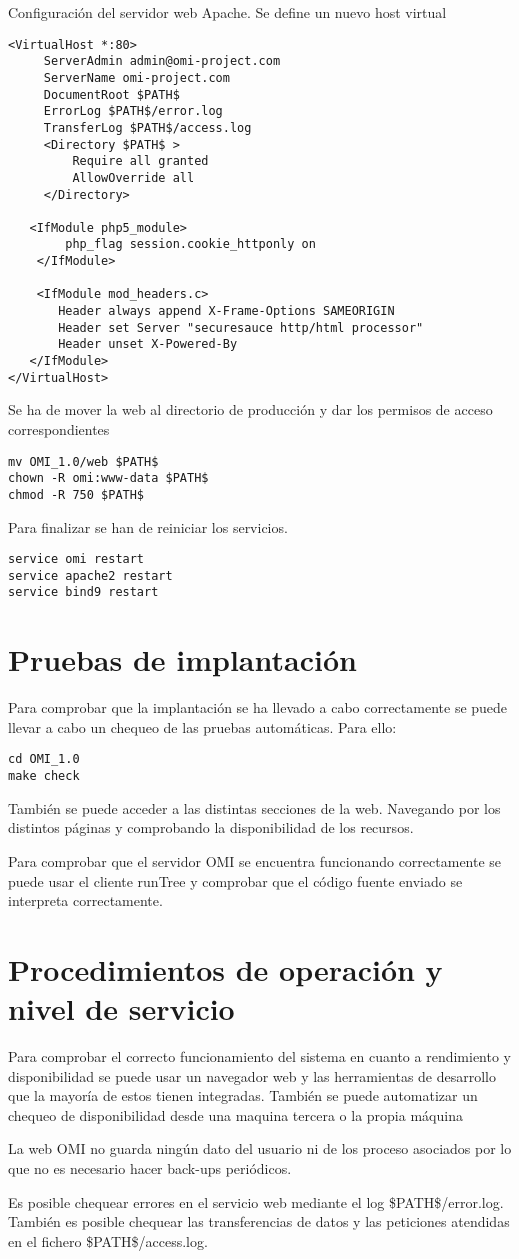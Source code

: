 Configuración del servidor web Apache. Se define un nuevo host virtual

\begin{lstlisting}
<VirtualHost *:80>
     ServerAdmin admin@omi-project.com
     ServerName omi-project.com
     DocumentRoot $PATH$
     ErrorLog $PATH$/error.log
     TransferLog $PATH$/access.log
     <Directory $PATH$ >
         Require all granted
         AllowOverride all
     </Directory>
   
   <IfModule php5_module>
	    php_flag session.cookie_httponly on
	</IfModule>

	<IfModule mod_headers.c>
       Header always append X-Frame-Options SAMEORIGIN
       Header set Server "securesauce http/html processor"
       Header unset X-Powered-By
   </IfModule>
</VirtualHost>
\end{lstlisting}

Se ha de mover la web al directorio de producción y dar los permisos de acceso correspondientes
\begin{lstlisting}
mv OMI_1.0/web $PATH$
chown -R omi:www-data $PATH$
chmod -R 750 $PATH$
\end{lstlisting}

Para finalizar se han de reiniciar los servicios.
\begin{lstlisting}
service omi restart
service apache2 restart
service bind9 restart
\end{lstlisting}

\section{Pruebas de implantación}
Para comprobar que la implantación se ha llevado a cabo correctamente se puede llevar a cabo un chequeo de las pruebas automáticas. Para ello:
\begin{lstlisting}
cd OMI_1.0
make check
\end{lstlisting}

También se puede acceder a las distintas secciones de la web. Navegando por los distintos páginas y comprobando la disponibilidad de los recursos.
 
 Para comprobar que el servidor OMI se encuentra funcionando correctamente se puede usar el cliente runTree y comprobar
 que el código fuente enviado se interpreta correctamente.
 
 \section{Procedimientos de operación y nivel de servicio}
 Para comprobar el correcto funcionamiento  del sistema en cuanto a rendimiento y disponibilidad se puede usar 
 un navegador web y las herramientas de desarrollo que la mayoría de estos tienen integradas. También se puede automatizar 
 un chequeo de disponibilidad desde una maquina tercera o la propia máquina
 
 La web OMI no guarda ningún dato del usuario ni de los proceso asociados por lo que no es necesario hacer back-ups periódicos. 
 
 Es posible chequear errores en el servicio web mediante el log \$PATH\$/error.log. También es posible
 chequear las transferencias de datos y las peticiones atendidas en el fichero \$PATH\$/access.log.
